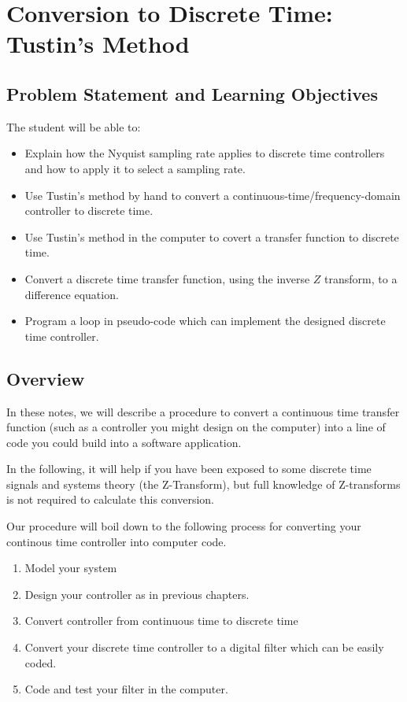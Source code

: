%
%
%

\chapter{Conversion to Discrete Time: Tustin's Method}

\section{Problem Statement and Learning Objectives}

The student will be able to:
\begin{itemize}
    \item Explain how the Nyquist sampling rate applies to discrete  time controllers and
    how to apply it to select a sampling rate. 
    \item Use Tustin's method by hand to convert a continuous-time/frequency-domain controller
    to discrete time.
    \item Use Tustin's method in the computer to covert a transfer function to discrete time. 
    \item Convert a discrete time transfer function, using the inverse $Z$ transform, to 
    a difference equation.
    \item  Program a loop in pseudo-code which can implement the designed discrete time controller. 
\end{itemize}

\section{Overview}
  In these notes, we will describe a procedure to convert a continuous time transfer function (such as a controller you might design on  the  computer) into a line of code you could build into a software application. 	%

In the following, it will help if you have been exposed to some discrete time signals and systems theory (the Z-Transform), but full knowledge of Z-transforms is not required to calculate this conversion.



Our procedure will boil down to the following process for converting your continous time controller
into computer code.

\begin{enumerate}
  \item Model your system
  \item Design your controller as in previous chapters.
  \item Convert controller from continuous time to discrete time
  \item Convert your discrete time controller to a digital filter which can be easily coded.
  \item Code and test your filter in the computer.
\end{enumerate}

